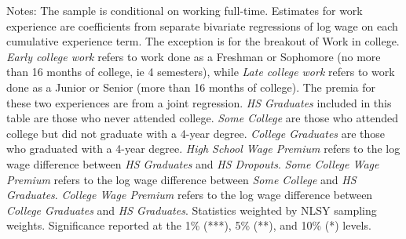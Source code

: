 \begin{table}[ht]
{\begin{threeparttable}
\begin{tabular}{lrrr@{}l}
\end{tabular} 
\footnotesize{Notes: The sample is conditional on working full-time. Estimates for work experience are coefficients from separate bivariate regressions of log wage on each cumulative experience term. The exception is for the breakout of Work in college. \emph{Early college work} refers to work done as a Freshman or Sophomore (no more than 16 months of college, ie 4 semesters), while \emph{Late college work} refers to work done as a Junior or Senior (more than 16 months of college). The premia for these two experiences are from a joint regression. \emph{HS Graduates} included in this table are those who never attended college. \emph{Some College} are those who attended college but did not graduate with a 4-year degree. \emph{College Graduates} are those who graduated with a 4-year degree. \emph{High School Wage Premium} refers to the log wage difference between \emph{HS Graduates} and \emph{HS Dropouts}. \emph{Some College Wage Premium} refers to the log wage difference between \emph{Some College} and \emph{HS Graduates}. \emph{College Wage Premium} refers to the log wage difference between \emph{College Graduates} and \emph{HS Graduates}. Statistics weighted by NLSY sampling weights. Significance reported at the 1\% (***), 5\% (**), and 10\% (*) levels.}
\end{threeparttable} 
} 
\end{table} 
